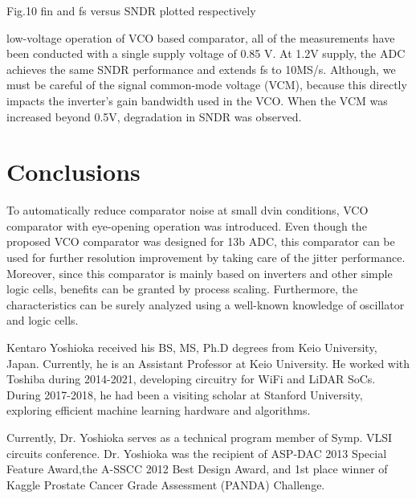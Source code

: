 \documentclass[letterpaper, 10 pt, conference]{ieeeconf}  %
\begin{document}
Fig.10 fin and fs versus SNDR plotted respectively

low-voltage operation of VCO based comparator, all of the measurements have been conducted with a single supply voltage of 0.85 V. At 1.2V supply, the ADC achieves the same SNDR performance and extends fs to 10MS/s. Although, we must be careful of the signal common-mode voltage (VCM), because this directly impacts the inverter’s gain bandwidth used in the VCO. When the VCM was increased beyond 0.5V, degradation in SNDR was observed.


\section{Conclusions}
To automatically reduce comparator noise at small dvin conditions, VCO comparator with eye-opening operation was introduced.  Even though the proposed VCO comparator was designed for 13b ADC, this comparator can be used for further resolution improvement by taking care of the jitter performance. Moreover, since this comparator is mainly based on inverters and other simple logic cells, benefits can be granted by process scaling. Furthermore, the characteristics can be surely analyzed using a well-known knowledge of oscillator and logic cells. 





\begin{IEEEbiography}
{Kentaro Yoshioka}
received his BS, MS, Ph.D degrees from Keio University, Japan. Currently, he is an Assistant Professor at Keio University. He worked with Toshiba during 2014-2021, developing circuitry for WiFi and LiDAR SoCs. During 2017-2018, he had been a visiting scholar at Stanford University, exploring efficient machine learning hardware and algorithms. 

Currently, Dr. Yoshioka serves as a technical program member of Symp. VLSI circuits conference. Dr. Yoshioka was the recipient of ASP-DAC 2013 Special Feature Award,the A-SSCC 2012 Best Design Award, and 1st place winner of Kaggle Prostate Cancer Grade Assessment (PANDA) Challenge.
\end{IEEEbiography}
\end{document}
